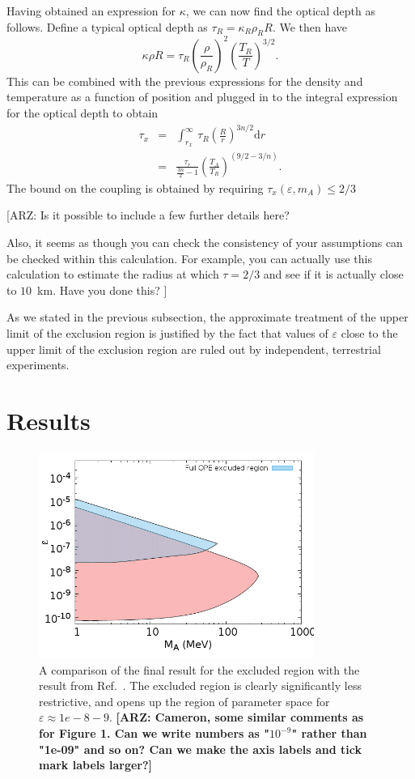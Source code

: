 \documentclass[nofootinbib,prd,superscriptaddress,twocolumn]{revtex4}
\newcommand{\beq}{\begin{equation}}
\newcommand{\eeq}{\end{equation}}
\newcommand{\bea}{\begin{eqnarray}}
\newcommand{\eea}{\end{eqnarray}}
\newcommand{\dd}{\mathrm{d}}
\newcommand{\arz}[1]{{{\bf{\color{BrickRed}[ARZ: #1]}}}}
\begin{document}
	
Having obtained an expression for $ \kappa $, we can now find the optical depth as follows. 
Define a typical optical depth as $\tau_R = \kappa_R \rho_R R $. We then have 
\beq 
\kappa \rho R = \tau_R \left( \frac{\rho}{\rho_R} \right)^2 \left( \frac{T_R}{T} \right)^{3/2}.
\eeq
%
This can be combined with the previous expressions for the density and temperature as a function of position 
and plugged in to the integral expression for the optical depth to obtain 
\bea 
\tau_x &=& \int_{r_x}^{\infty}\, \tau_R \left( \frac{R}{r} \right)^{3n/2} \dd r \\
 &=& \frac{\tau_r}{\frac{3n}{2}-1} \left( \frac{T_A}{T_R} \right)^{(9/2-3/n)}. 
 \eea
 The bound on the coupling is obtained by requiring  $ \tau_x(\varepsilon,m_A) \le 2/3 $
 \arz{Is it possible to include a few further details here? 
 
 Also, it seems as though you can check the consistency of your assumptions can 
 be checked within this calculation. For example, you can actually use this calculation 
 to estimate the radius at which $\tau=2/3$ and see if it is actually close to 
 $10$~km. Have you done this?
 }
 

As we stated in the previous subsection, the approximate treatment of the upper limit of the exclusion region 
is justified by the fact that values of $\varepsilon$ close to the upper limit of the exclusion region are 
ruled out by independent, terrestrial experiments.


\section{Results}
\label{section:results}


\begin{figure}[th]
	\includegraphics[width=9cm]{endtoend.png}
	\caption{A comparison of the final result for the excluded region with the result from Ref.~\cite{dent_etal12}. The excluded region is clearly significantly less restrictive, and opens up the region of parameter space for $\varepsilon \approx  1e-8-9 $.
\arz{Cameron, some similar comments as for Figure 1. Can we write numbers as "$10^{-9}$" rather 
than "1e-09" and so on? Can we make the axis labels and tick mark labels larger?}}
\label{fig:constraint}
\end{figure}
\end{document}
